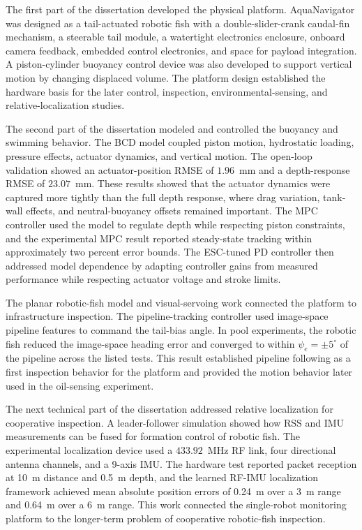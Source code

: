 \documentclass{uhcoethesis}
\begin{document}
The first part of the dissertation developed the physical platform. AquaNavigator was designed as a tail-actuated robotic fish with a double-slider-crank caudal-fin mechanism, a steerable tail module, a watertight electronics enclosure, onboard camera feedback, embedded control electronics, and space for payload integration. A piston-cylinder buoyancy control device was also developed to support vertical motion by changing displaced volume. The platform design established the hardware basis for the later control, inspection, environmental-sensing, and relative-localization studies.

The second part of the dissertation modeled and controlled the buoyancy and swimming behavior. The BCD model coupled piston motion, hydrostatic loading, pressure effects, actuator dynamics, and vertical motion. The open-loop validation showed an actuator-position RMSE of $1.96$~mm and a depth-response RMSE of $23.07$~mm. These results showed that the actuator dynamics were captured more tightly than the full depth response, where drag variation, tank-wall effects, and neutral-buoyancy offsets remained important. The MPC controller used the model to regulate depth while respecting piston constraints, and the experimental MPC result reported steady-state tracking within approximately two percent error bounds. The ESC-tuned PD controller then addressed model dependence by adapting controller gains from measured performance while respecting actuator voltage and stroke limits.

The planar robotic-fish model and visual-servoing work connected the platform to infrastructure inspection. The pipeline-tracking controller used image-space pipeline features to command the tail-bias angle. In pool experiments, the robotic fish reduced the image-space heading error and converged to within $\psi_e=\pm 5^\circ$ of the pipeline across the listed tests. This result established pipeline following as a first inspection behavior for the platform and provided the motion behavior later used in the oil-sensing experiment.

The next technical part of the dissertation addressed relative localization for cooperative inspection. A leader-follower simulation showed how RSS and IMU measurements can be fused for formation control of robotic fish. The experimental localization device used a $433.92$~MHz RF link, four directional antenna channels, and a 9-axis IMU. The hardware test reported packet reception at 10~m distance and 0.5~m depth, and the learned RF-IMU localization framework achieved mean absolute position errors of 0.24~m over a 3~m range and 0.64~m over a 6~m range. This work connected the single-robot monitoring platform to the longer-term problem of cooperative robotic-fish inspection.
\end{document}
